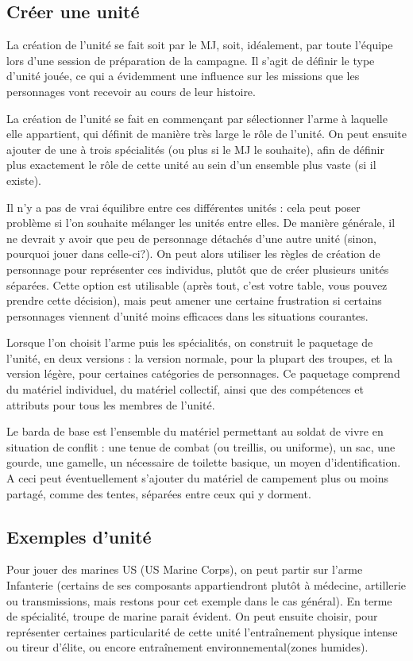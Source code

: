 \documentclass{report}
\begin{document}
\begin{multicols}{2}
\section{Créer une unité}
La création de l'unité se fait soit par le MJ, soit, idéalement, par toute l'équipe lors d'une session de préparation de la campagne. Il s'agit de définir le type d'unité jouée, ce qui a évidemment une influence sur les missions que les personnages vont recevoir au cours de leur histoire.

La création de l'unité se fait en commençant par sélectionner l'arme à laquelle elle appartient, qui définit de manière très large le rôle de l'unité. On peut ensuite ajouter de une à trois spécialités (ou plus si le MJ le souhaite), afin de définir plus exactement le rôle de cette unité au sein d'un ensemble plus vaste (si il existe). 


Il n'y a pas de vrai équilibre entre ces différentes unités : cela peut poser problème si l'on souhaite mélanger les unités entre elles. De manière générale, il ne devrait y avoir que peu de personnage détachés d'une autre unité (sinon, pourquoi jouer dans celle-ci?). On peut alors utiliser les règles de création de personnage pour représenter ces individus, plutôt que de créer plusieurs unités séparées. Cette option est utilisable (après tout, c'est votre table, vous pouvez prendre cette décision), mais peut amener une certaine frustration si certains personnages viennent d'unité moins efficaces dans les situations courantes.

Lorsque l'on choisit l'arme puis les spécialités, on construit le paquetage de l'unité, en deux versions : la version normale, pour la plupart des troupes, et la version légère, pour certaines catégories de personnages. Ce paquetage comprend du matériel individuel, du matériel collectif, ainsi que des compétences et attributs pour tous les membres de l'unité.

Le barda de base est l'ensemble du matériel permettant au soldat de vivre en situation de conflit : une tenue de combat (ou treillis, ou uniforme), un sac, une gourde, une gamelle, un nécessaire de toilette basique, un moyen d'identification. A ceci peut éventuellement s'ajouter du matériel de campement plus ou moins partagé, comme des tentes, séparées entre ceux qui y dorment.

\subsection{Exemples d'unité}
Pour jouer des marines US (US Marine Corps), on peut partir sur l'arme Infanterie (certains de ses composants appartiendront plutôt à médecine, artillerie ou transmissions, mais restons pour cet exemple dans le cas général). En terme de spécialité, troupe de marine parait évident. On peut ensuite choisir, pour représenter certaines particularité de cette unité l'entraînement physique intense ou tireur d'élite, ou encore entraînement environnemental(zones humides). 


\end{multicols}
\end{document}
